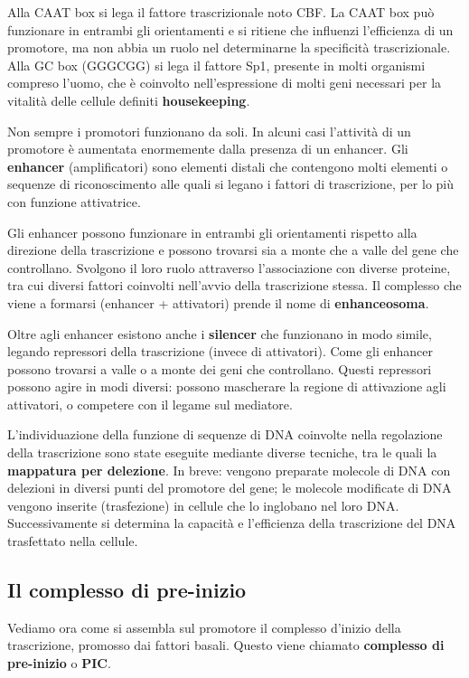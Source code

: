 \documentclass[11pt]{book}
\begin{document}
Alla CAAT box si lega il fattore trascrizionale noto CBF. La CAAT box
può funzionare in entrambi gli orientamenti e si ritiene che influenzi
l'efficienza di un promotore, ma non abbia un ruolo nel determinarne la
specificità trascrizionale. Alla GC box (GGGCGG) si lega il fattore Sp1,
presente in molti organismi compreso l'uomo, che è coinvolto
nell'espressione di molti geni necessari per la vitalità delle cellule
definiti \textbf{housekeeping}.

Non sempre i promotori funzionano da soli. In alcuni casi l'attività di
un promotore è aumentata enormemente dalla presenza di un enhancer. Gli
\textbf{enhancer} (amplificatori) sono elementi distali che contengono
molti elementi o sequenze di riconoscimento alle quali si legano i
fattori di trascrizione, per lo più con funzione attivatrice.

Gli enhancer possono funzionare in entrambi gli orientamenti rispetto
alla direzione della trascrizione e possono trovarsi sia a monte che a
valle del gene che controllano. Svolgono il loro ruolo attraverso
l'associazione con diverse proteine, tra cui diversi fattori coinvolti
nell'avvio della trascrizione stessa. Il complesso che viene a formarsi
(enhancer + attivatori) prende il nome di \textbf{enhanceosoma}.

Oltre agli enhancer esistono anche i \textbf{silencer} che funzionano in
modo simile, legando repressori della trascrizione (invece di
attivatori). Come gli enhancer possono trovarsi a valle o a monte dei
geni che controllano. Questi repressori possono agire in modi diversi:
possono mascherare la regione di attivazione agli attivatori, o
competere con il legame sul mediatore.

L'individuazione della funzione di sequenze di DNA coinvolte nella
regolazione della trascrizione sono state eseguite mediante diverse
tecniche, tra le quali la \textbf{mappatura per delezione}. In breve:
vengono preparate molecole di DNA con delezioni in diversi punti del
promotore del gene; le molecole modificate di DNA vengono inserite
(trasfezione) in cellule che lo inglobano nel loro DNA. Successivamente
si determina la capacità e l'efficienza della trascrizione del DNA
trasfettato nella cellule.

\subsection{Il complesso di pre-inizio}\label{il-complesso-di-pre-inizio}

Vediamo ora come si assembla sul promotore il complesso d'inizio della
trascrizione, promosso dai fattori basali. Questo viene chiamato
\textbf{complesso di pre-inizio} o \textbf{PIC}.
\end{document}

